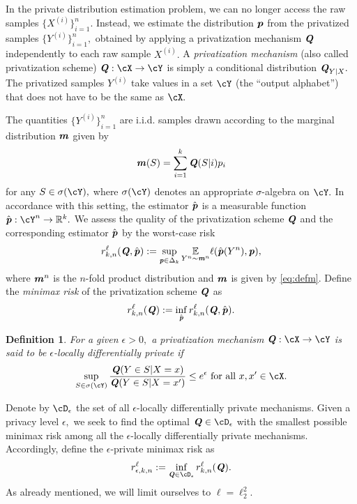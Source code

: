 \documentclass[11pt,onecolumn]{IEEEtran}
\newtheorem{definition}[theorem]{Definition}
\def\mathbi#1{{\textbf{\textit #1}}}
\begin{document}
In the private distribution estimation problem, we can no longer access the raw samples $\{X^{(i)}\}_{i=1}^n.$ Instead, we estimate the distribution $\mathbi{p}$ from the privatized samples $\{Y^{(i)}\}_{i=1}^n,$ obtained by applying a privatization mechanism $\mathbi{Q}$ independently to each raw sample $X^{(i)}.$ A {\em privatization mechanism} (also called privatization scheme) $\mathbi{Q}:\cX\to\cY$ is simply a conditional distribution $\mathbi{Q}_{Y|X}.$ The
privatized samples $Y^{(i)}$ take values in a set $\cY$ (the ``output alphabet'') that does not have to be the same as $\cX.$

The quantities $\{Y^{(i)}\}_{i=1}^n$ are i.i.d. samples drawn according to the marginal distribution $\mathbi{m}$ given by
\begin{equation}\label{eq:defm}
\mathbi{m}(S)=\sum_{i=1}^k \mathbi{Q}(S|i)p_i
\end{equation}
 for any $S\in \sigma(\cY),$ where $\sigma(\cY)$ denotes an appropriate $\sigma$-algebra on $\cY.$
In accordance with this setting, the estimator $\hat{\mathbi{p}}$ is a measurable function $\hat{\mathbi{p}}:\cY^n\to \mathbb{R}^k.$
We assess the quality of the privatization scheme $\mathbi{Q}$ and the corresponding estimator $\hat{\mathbi{p}}$ by the worst-case risk 
$$
r_{k,n}^{\ell} (\mathbi{Q}, \hat{\mathbi{p}}) := \sup_{\mathbi{p}\in \Delta_k} 
\underset{Y^n\sim \mathbi{m}^n}{\mathbb{E}} \ell(\hat{\mathbi{p}}(Y^n), \mathbi{p}),
$$
where $\mathbi{m}^n$ is the $n$-fold product distribution and $\mathbi m$ is given by \eqref{eq:defm}.
Define the {\em minimax risk} of the privatization scheme $\mathbi{Q}$ as
  \begin{equation}\label{eq:riskQ}
r_{k,n}^{\ell} (\mathbi{Q}):= \inf_{\hat{\mathbi{p}}} r_{k,n}^{\ell} (\mathbi{Q}, \hat{\mathbi{p}}).
   \end{equation}
\begin{definition}
For a given $\epsilon>0,$
a privatization mechanism $\mathbi{Q}:\cX\to\cY$ is said to be {\em $\epsilon$-locally differentially private} if 
\begin{equation}\label{eq:defep}
\sup_{S\in\sigma(\cY)} \frac{\mathbi{Q}(Y\in S|X=x)}{\mathbi{Q}(Y\in S|X=x')} \le e^{\epsilon}
\text{~for all~} x,x'\in\cX.
\end{equation}
\end{definition}


Denote by $\cD_{\epsilon}$ the set of all $\epsilon$-locally differentially private mechanisms. Given a privacy level 
$\epsilon,$ we seek to find the optimal $\mathbi{Q}\in\cD_{\epsilon}$ with the smallest possible minimax risk among all the 
$\epsilon$-locally differentially private mechanisms. Accordingly, define the $\epsilon$-private minimax risk as
 \begin{equation}
r_{\epsilon,k,n}^{\ell} := \inf_{\mathbi{Q}\in\cD_{\epsilon}}r_{k,n}^{\ell} (\mathbi{Q}).
  \label{eq:rekn}
  \end{equation}
  As already mentioned, we will limit ourselves to $\ell=\ell_2^2.$
  
\end{document}
